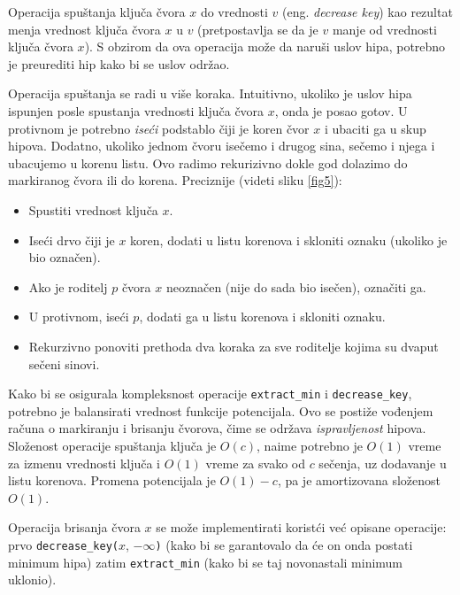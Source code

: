 \documentclass[a4paper]{article}
\theoremstyle{plain}
\theoremstyle{definition}
\begin{document}
Operacija spu\v{s}tanja klju\v{c}a \v{c}vora $x$ do vrednosti $v$ (eng. \emph{decrease key}) kao rezultat menja vrednost klju\v{c}a \v{c}vora $x$ u $v$ (pretpostavlja se da je $v$  manje od vrednosti klju\v{c}a \v{c}vora $x$). S obzirom da ova operacija mo\v{z}e da naru\v{s}i uslov hipa, potrebno je preurediti hip kako bi se uslov odr\v{zao}.

Operacija spu\v{s}tanja se radi u vi\v{s}e koraka. Intuitivno, ukoliko je uslov hipa ispunjen posle spu{s}tanja vrednosti klju\v{c}a \v{c}vora $x$, onda je posao gotov. U protivnom je potrebno \emph{ise\'c{}i} podstablo \v{c}iji je koren \v{c}vor $x$ i ubaciti ga u skup hipova. Dodatno, ukoliko jednom \v{c}voru ise\v{c}emo i drugog sina, se\v{c}emo i njega i ubacujemo u korenu listu. Ovo radimo rekurizivno dokle god dolazimo do markiranog \v{c}vora ili do korena. Preciznije (videti sliku \ref{fig5}):
\begin{itemize}
    \item Spustiti vrednost klju\v{c}a $x$.
    \item Ise\'c{}i drvo \v{c}iji je $x$ koren, dodati u listu korenova i skloniti oznaku (ukoliko je bio ozna\v{c}en).
    \item Ako je roditelj $p$ \v{c}vora $x$ neozna\v{c}en (nije do sada bio ise\v{c}en), ozna\v{c}iti ga.
    \item U protivnom, ise\'{c}i $p$, dodati ga u listu korenova i skloniti oznaku.
    \item Rekurzivno ponoviti prethoda dva koraka za sve roditelje kojima su dvaput se\v{c}eni sinovi. 
\end{itemize}

Kako bi se osigurala kompleksnost operacije \texttt{extract\_min} i \texttt{decrease\_key}, potrebno je balansirati vrednost funkcije potencijala. Ovo se posti\v{z}e vođenjem ra\v{c}una o markiranju i brisanju \v{c}vorova, \v{c}ime se odr\v{z}ava \emph{ispravljenost} hipova.
Slo\v{z}enost operacije spu\v{s}tanja klju\v{c}a je $O(c)$, naime potrebno je $O(1)$ vreme za izmenu vrednosti klju\v{c}a i $O(1)$ vreme za svako od $c$ se\v{c}enja, uz dodavanje u listu korenova. Promena potencijala je $O(1) - c$, pa je amortizovana slo\v{z}enost $O(1)$.

Operacija brisanja \v{c}vora $x$ se mo\v{z}e implementirati korist\'c{}i ve\'c{} opisane operacije: prvo \texttt{decrease\_key(}$x$, $-\infty$\texttt{)}  (kako bi se garantovalo da \'c{}e on onda postati minimum hipa) zatim \texttt{extract\_min} (kako bi se taj novonastali minimum uklonio).
\end{document}
